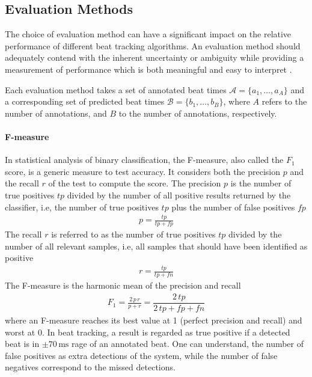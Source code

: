 \documentclass{scrartcl}
\begin{document}
\subsection{Evaluation Methods}

The choice of evaluation method can have a significant impact on the relative performance of different beat tracking algorithms. An evaluation method should adequately contend with the inherent uncertainty or ambiguity while providing a measurement of performance which is both meaningful and easy to interpret \cite{Davies2009b}. 

Each evaluation method takes a set of annotated beat times $\mathcal A = \{a_1, \dots, a_A\}$ and a corresponding set of predicted beat times $\mathcal B = \{b_1, \dots, b_B\}$, where $A$ refers to the number of annotations, and $B$ to the number of annotations, respectively.


\paragraph{F-measure} 
In statistical analysis of binary classification, the F-measure, also called the $F_1$ score, is a generic measure to test accuracy. It considers both the precision $p$ and the recall $r$ of the test to compute the score. The precision $p$ is the number of true positives $tp$ divided by the number of all positive results returned by the classifier, i.e, the number of true positives $tp$ plus the number of false positives $fp$
\begin{align}
p = \frac{tp}{tp + fp}
\end{align} 
The recall $r$ is referred to as the number of true positives $tp$ divided by the number of all relevant samples, i.e, all samples that should have been identified as positive
\begin{align}
r = \frac{tp}{tp + fn}
\end{align} 
The F-measure is the harmonic mean of the precision and recall
\begin{align}
F_1=  \frac{2\,p\, r}{p +r} = \dfrac{2\, tp}{2\, tp + fp + fn}
\end{align} 
where an F-measure reaches its best value at 1 (perfect precision and recall) and worst at 0. In beat tracking, a result is regarded as true positive if a detected beat is in $\pm 70\,\text{ms}$ rage of an annotated beat. One can understand, the number of false positives as extra detections of the system, while the number of false negatives correspond to the missed detections.
\end{document}
